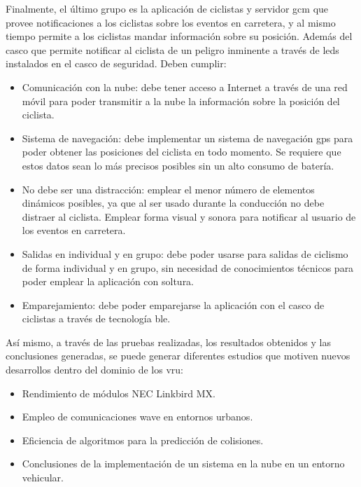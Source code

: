 Finalmente, el último grupo es la aplicación de ciclistas y servidor \gls{gcm}
que provee notificaciones a los ciclistas sobre los eventos en carretera, y al
mismo tiempo permite a los ciclistas mandar información sobre su posición.
Además del casco  que permite notificar al ciclista de un peligro
inminente a través de leds instalados en el casco de seguridad. Deben cumplir:
\begin{itemize}
	\item Comunicación con la nube: debe tener acceso a Internet a través de una
	red móvil para poder transmitir a la nube la información sobre la posición
	del ciclista.

	\item Sistema de navegación: debe implementar un sistema de navegación
	\gls{gps} para poder obtener las posiciones del ciclista en todo momento. Se
	requiere que estos datos sean lo más precisos posibles sin un alto consumo de
	batería.

	\item No debe ser una distracción: emplear el menor número de elementos
	dinámicos posibles, ya que al ser usado durante la conducción no debe
	distraer al ciclista. Emplear forma visual y sonora para notificar al usuario
	de los eventos en carretera.

	\item Salidas en individual y en grupo: debe poder usarse para salidas de
	ciclismo de forma individual y en grupo, sin necesidad de conocimientos
	técnicos para poder emplear la aplicación con soltura.

	\item Emparejamiento: debe poder emparejarse la aplicación con el casco de
	ciclistas a través de tecnología \gls{ble}.
\end{itemize}

Así mismo, a través de las pruebas realizadas, los resultados obtenidos y las
conclusiones generadas, se puede generar diferentes estudios que motiven nuevos
desarrollos dentro del dominio de los \gls{vru}:
\begin{itemize}
	\item Rendimiento de módulos NEC Linkbird MX.

	\item Empleo de comunicaciones \gls{wave} en entornos urbanos.

	\item Eficiencia de algoritmos para la predicción de colisiones.

	\item Conclusiones de la implementación de un sistema en la nube en un
	entorno vehicular.
\end{itemize}
